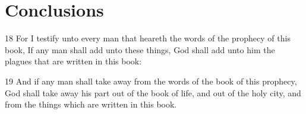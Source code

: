 \chapter{Conclusions}

18 For I testify unto every man that heareth the words of the
prophecy of this book, If any man shall add unto these things, God
shall add unto him the plagues that are written in this book:

19 And if any man shall take away from the words of the book of
this prophecy, God shall take away his part out of the book of
life, and out of the holy city, and from the things which are
written in this book.
